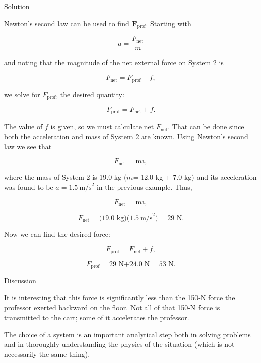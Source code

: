 \documentclass[
]{book}
\begin{document}
{Solution}

Newton's second law can be used to find \(\textbf{F}_{\text{prof}}{}\).
Starting with

\leavevmode{}%
\[{a = \frac{F_{\text{net}}}{m}}{}\]

and noting that the magnitude of the net external force on System 2 is

\leavevmode{}%
\[{F_{\text{net}} = {F_{\text{prof}} - f}},\]

we solve for \(F_{\text{prof}}{}\), the desired quantity:

\leavevmode{}%
\[{F_{\text{prof}} = {F_{\text{net}} + f.}}{}\]

The value of \(f{}\)\emph{} is given, so we must
calculate net \(F_{\text{net}}{}\). That can be done since both the
acceleration and mass of System 2 are known. Using Newton's second law
we see that

\leavevmode{}%
\[{F_{\text{net}} = \text{ma}},\]

where the mass of System 2 is 19.0 kg
(\(m{}\)\emph{}= 12.0 kg + 7.0 kg) and its
acceleration was found to be \({{a = 1.5\ }\text{m/s}^{2}}{}\) in the
previous example. Thus,

\leavevmode{}%
\[{F_{\text{net}} = \text{ma}},\]

\leavevmode{}%
\[{{F_{\text{net}} = (}\text{19}\text{.}\text{0\ kg})(1.5\ \text{m/s}^{2}{) = \text{29\ N}}}.\]

Now we can find the desired force:

\leavevmode{}%
\[{F_{\text{prof}} = {F_{\text{net}} + f}},\]

\leavevmode{}%
\[{{F_{\text{prof}} = \text{29\ N}}{+ \text{24.0\ N} = \text{53\ N}}}.\]

{Discussion}

It is interesting that this force is significantly less than the 150-N
force the professor exerted backward on the floor. Not all of that 150-N
force is transmitted to the cart; some of it accelerates the professor.

The choice of a system is an important analytical step both in solving
problems and in thoroughly understanding the physics of the situation
(which is not necessarily the same thing).
\end{document}
